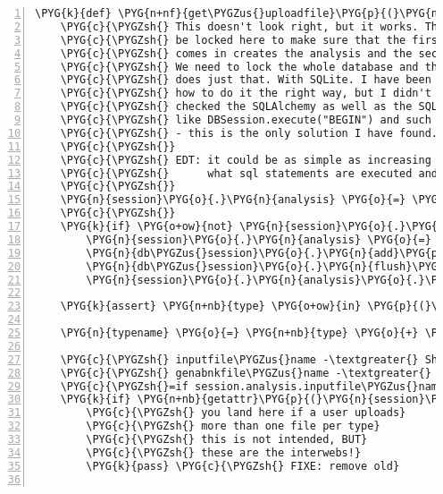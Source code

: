 \begin{Verbatim}[commandchars=\\\{\},numbers=left,firstnumber=1,stepnumber=5]
\PYG{k}{def} \PYG{n+nf}{get\PYGZus{}uploadfile}\PYG{p}{(}\PYG{n}{db\PYGZus{}session}\PYG{p}{,} \PYG{n}{session}\PYG{p}{,} \PYG{n}{name}\PYG{p}{,} \PYG{n+nb}{type}\PYG{p}{)}\PYG{p}{:}
    \PYG{c}{\PYGZsh{} This doesn't look right, but it works. The database needs to}
    \PYG{c}{\PYGZsh{} be locked here to make sure that the first upload request that}
    \PYG{c}{\PYGZsh{} comes in creates the analysis and the second uses the same analysis.}
    \PYG{c}{\PYGZsh{} We need to lock the whole database and this seemingly useless statement}
    \PYG{c}{\PYGZsh{} does just that. With SQLite. I have been asking on irc \PYGZsh{}sqlalchemy about}
    \PYG{c}{\PYGZsh{} how to do it the right way, but I didn't get any useful reply. I have}
    \PYG{c}{\PYGZsh{} checked the SQLAlchemy as well as the SQLite docs and tried various things}
    \PYG{c}{\PYGZsh{} like DBSession.execute("BEGIN") and such things - nothing seems to work}
    \PYG{c}{\PYGZsh{} - this is the only solution I have found.}
    \PYG{c}{\PYGZsh{}}
    \PYG{c}{\PYGZsh{} EDT: it could be as simple as increasing the sqlalchemy debug level, check}
    \PYG{c}{\PYGZsh{}      what sql statements are executed and then DBSession.execute() those}
    \PYG{c}{\PYGZsh{}}
    \PYG{n}{session}\PYG{o}{.}\PYG{n}{analysis} \PYG{o}{=} \PYG{n}{session}\PYG{o}{.}\PYG{n}{analysis}
    \PYG{c}{\PYGZsh{}}
    \PYG{k}{if} \PYG{o+ow}{not} \PYG{n}{session}\PYG{o}{.}\PYG{n}{analysis}\PYG{p}{:}
        \PYG{n}{session}\PYG{o}{.}\PYG{n}{analysis} \PYG{o}{=} \PYG{n}{Analysis}\PYG{p}{(}\PYG{p}{)}
        \PYG{n}{db\PYGZus{}session}\PYG{o}{.}\PYG{n}{add}\PYG{p}{(}\PYG{n}{session}\PYG{o}{.}\PYG{n}{analysis}\PYG{p}{)} \PYG{c}{\PYGZsh{} needed ?}
        \PYG{n}{db\PYGZus{}session}\PYG{o}{.}\PYG{n}{flush}\PYG{p}{(}\PYG{p}{)} \PYG{c}{\PYGZsh{} sets analysis.id}
        \PYG{n}{session}\PYG{o}{.}\PYG{n}{analysis}\PYG{o}{.}\PYG{n}{create\PYGZus{}data\PYGZus{}dir}\PYG{p}{(}\PYG{p}{)}

    \PYG{k}{assert} \PYG{n+nb}{type} \PYG{o+ow}{in} \PYG{p}{(}\PYG{l+s}{'}\PYG{l+s}{inputfile}\PYG{l+s}{'}\PYG{p}{,} \PYG{l+s}{'}\PYG{l+s}{genbankfile}\PYG{l+s}{'}\PYG{p}{)}

    \PYG{n}{typename} \PYG{o}{=} \PYG{n+nb}{type} \PYG{o}{+} \PYG{l+s}{'}\PYG{l+s}{\PYGZus{}name}\PYG{l+s}{'}

    \PYG{c}{\PYGZsh{} inputfile\PYGZus{}name -\textgreater{} Short Reads in SRA or FASTQ format}
    \PYG{c}{\PYGZsh{} genabnkfile\PYGZus{}name -\textgreater{} Organism genbank file}
    \PYG{c}{\PYGZsh{}=if session.analysis.inputfile\PYGZus{}name:}
    \PYG{k}{if} \PYG{n+nb}{getattr}\PYG{p}{(}\PYG{n}{session}\PYG{o}{.}\PYG{n}{analysis}\PYG{p}{,} \PYG{n+nb}{type} \PYG{o}{+} \PYG{l+s}{'}\PYG{l+s}{\PYGZus{}uploaded}\PYG{l+s}{'}\PYG{p}{)}\PYG{p}{:}
        \PYG{c}{\PYGZsh{} you land here if a user uploads}
        \PYG{c}{\PYGZsh{} more than one file per type}
        \PYG{c}{\PYGZsh{} this is not intended, BUT}
        \PYG{c}{\PYGZsh{} these are the interwebs!}
        \PYG{k}{pass} \PYG{c}{\PYGZsh{} FIXE: remove old}


\end{Verbatim}

